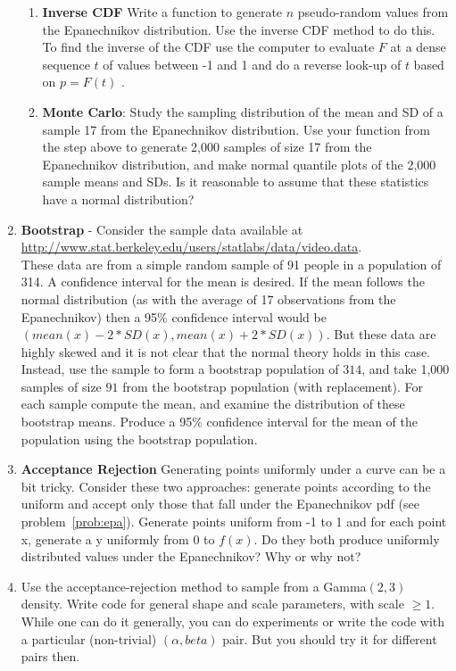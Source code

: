 \begin{enumerate}
\begin{enumerate}
\item \textbf{Inverse CDF} Write a function to generate $n$ pseudo-random
values from the Epanechnikov  distribution.
Use the inverse CDF method to do this.  To find the inverse of the CDF use the
computer to evaluate $F$ at a dense sequence $t$ of values between -1 and 1
and do a reverse look-up of $t$ based on $p = F(t)$ .

\item \textbf{Monte Carlo}: Study the sampling distribution of  the mean and SD
of a sample 17 from the Epanechnikov distribution.  Use your function from the
step above to generate 2,000 samples of size 17 from the Epanechnikov distribution,
and make normal quantile plots of the 2,000 sample means and SDs.
Is it reasonable to assume that these statistics have a normal distribution?

\end{enumerate}

\item
 \textbf{Bootstrap} - Consider the sample data available at \\
\url{http://www.stat.berkeley.edu/users/statlabs/data/video.data}. \\
These data are from a simple random sample of 91 people in a population of 314.  A confidence interval for the mean is desired.  If the mean follows the
normal distribution (as with the average of 17 observations from the
Epanechnikov)  then a 95\% confidence interval would be
$( mean(x) - 2*SD(x), mean(x) + 2*SD(x))$.
But these data are highly skewed and it is not clear that the normal theory
holds in this case.
Instead, use the sample to form a bootstrap population of $314$,
and take 1,000 samples of size $91$ from the bootstrap population (with replacement).
 For each sample compute  the mean, and examine the distribution of these
 bootstrap means. Produce a 95\% confidence interval for the mean of
 the population using the bootstrap population.

\item  \textbf{Acceptance Rejection} Generating points  uniformly  under a curve can
be a bit tricky.  Consider these two approaches: generate points according to the 
uniform and accept only those that fall under the Epanechnikov pdf (see problem~\ref{prob:epa}).
Generate points uniform from -1 to 1 and for each point x, generate a y
uniformly from 0 to $f(x)$.  Do they both produce uniformly distributed
values under the Epanechnikov?  Why or why not?

\item
  Use the acceptance-rejection method to sample from a Gamma$(2, 3)$ density.  Write code for general shape and scale parameters, with scale $\ge 1$.  While one can do it generally, you can do experiments or write the code with a particular (non-trivial) $(\alpha, beta)$ pair.  But you should try it for different pairs then.


\end{enumerate}
